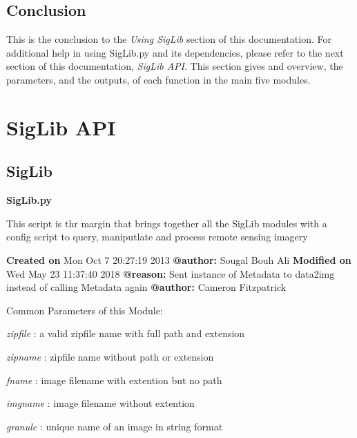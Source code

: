 \documentclass[letterpaper,10pt,openany,oneside]{sphinxmanual}
\begin{document}
\section{Conclusion}
\label{tutorial:conclusion}
This is the conclusion to the \emph{Using SigLib} section of this documentation. For
additional help in using SigLib.py and its dependencies, please refer to the next section
of this documentation, \emph{SigLib API}. This section gives and overview, the parameters,
and the outputs, of each function in the main five modules.


\chapter{SigLib API}
\label{code:siglib-api}\label{code::doc}

\section{SigLib}
\label{code:module-SigLib}\label{code:siglib}
\textbf{SigLib.py}

This script is thr margin that brings together all the SigLib modules with a config script to query, maniputlate and process remote sensing imagery

\textbf{Created on} Mon Oct  7 20:27:19 2013 \textbf{@author:} Sougal Bouh Ali
\textbf{Modified on} Wed May  23 11:37:40 2018 \textbf{@reason:} Sent instance of Metadata to data2img instead of calling Metadata again \textbf{@author:} Cameron Fitzpatrick

Common Parameters of this Module:

\emph{zipfile} : a valid zipfile name with full path and extension

\emph{zipname} : zipfile name without path or extension

\emph{fname} : image filename with extention but no path

\emph{imgname} : image filename without extention

\emph{granule} : unique name of an image in string format
\end{document}
